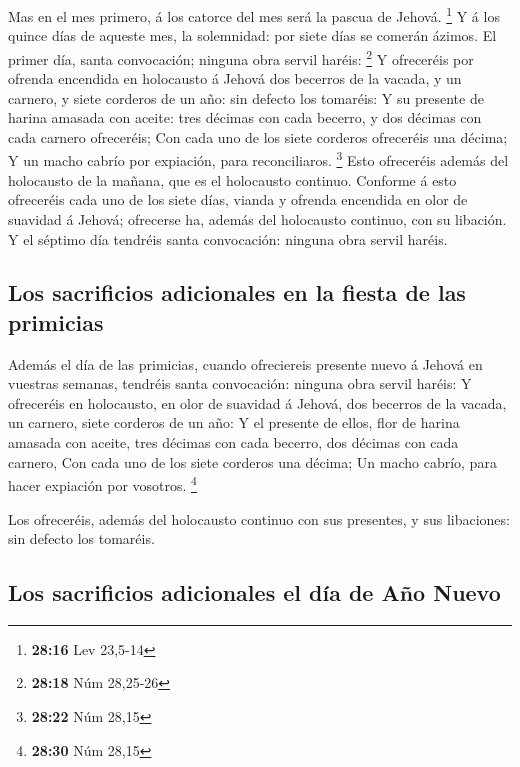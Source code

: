  Mas en el mes primero, á los catorce del mes será la
pascua de Jehová. \footnote{\textbf{28:16} Lev 23,5-14}  Y
á los quince días de aqueste mes, la solemnidad: por siete días se
comerán ázimos.  El primer día, santa convocación; ninguna
obra servil haréis: \footnote{\textbf{28:18} Núm 28,25-26} 
Y ofreceréis por ofrenda encendida en holocausto á Jehová dos becerros
de la vacada, y un carnero, y siete corderos de un año: sin defecto los
tomaréis:  Y su presente de harina amasada con aceite: tres
décimas con cada becerro, y dos décimas con cada carnero ofreceréis;
 Con cada uno de los siete corderos ofreceréis una décima;
 Y un macho cabrío por expiación, para reconciliaros.
\footnote{\textbf{28:22} Núm 28,15}  Esto ofreceréis además
del holocausto de la mañana, que es el holocausto continuo.
 Conforme á esto ofreceréis cada uno de los siete días,
vianda y ofrenda encendida en olor de suavidad á Jehová; ofrecerse ha,
además del holocausto continuo, con su libación.  Y el
séptimo día tendréis santa convocación: ninguna obra servil haréis.

\hypertarget{los-sacrificios-adicionales-en-la-fiesta-de-las-primicias}{%
\subsection{Los sacrificios adicionales en la fiesta de las
primicias}\label{los-sacrificios-adicionales-en-la-fiesta-de-las-primicias}}

 Además el día de las primicias, cuando ofreciereis
presente nuevo á Jehová en vuestras semanas, tendréis santa convocación:
ninguna obra servil haréis:  Y ofreceréis en holocausto, en
olor de suavidad á Jehová, dos becerros de la vacada, un carnero, siete
corderos de un año:  Y el presente de ellos, flor de harina
amasada con aceite, tres décimas con cada becerro, dos décimas con cada
carnero,  Con cada uno de los siete corderos una décima;
 Un macho cabrío, para hacer expiación por vosotros.
\footnote{\textbf{28:30} Núm 28,15}

 Los ofreceréis, además del holocausto continuo con sus
presentes, y sus libaciones: sin defecto los tomaréis.

\hypertarget{los-sacrificios-adicionales-el-duxeda-de-auxf1o-nuevo}{%
\subsection{Los sacrificios adicionales el día de Año
Nuevo}\label{los-sacrificios-adicionales-el-duxeda-de-auxf1o-nuevo}}

